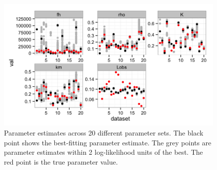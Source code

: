 \documentclass[12pt,reqno,final,pdftex]{amsart}\usepackage[]{graphicx}\usepackage[]{color}
\newenvironment{knitrout}{}{} %
\theoremstyle{plain}
\numberwithin{equation}{part}
\begin{document}
\begin{knitrout}\scriptsize
{}\color{fgcolor}\begin{figure}

\includegraphics[width=\linewidth]{figure/mult-datasets-fitting-1} \hfill{}

\caption[Parameter estimates across 20 different parameter sets]{Parameter estimates across 20 different parameter sets. The black point shows the best-fitting parameter estimate. The grey points are parameter estimates within 2 log-likelihood units of the best. The red point is the true parameter value.}\label{fig:mult-datasets-fitting}
\end{figure}


\end{knitrout}

\clearpage
\end{document}
